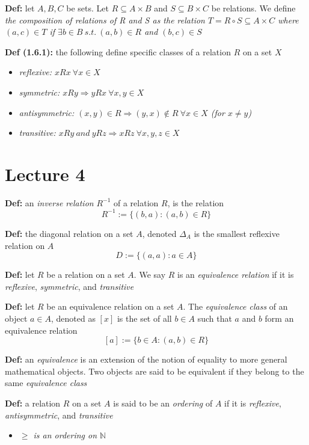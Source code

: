 \documentclass[12pt]{article}
\begin{document}
\textbf{Def: }let $A, B, C$ be sets. Let $R \subseteq A \times B$ and $S \subseteq B \times C$ be relations. We define \emph{the composition of relations of R and S as the relation $T = R \circ S \subseteq A \times C$ where $(a, c) \in T$ if $\exists b \in B\ s.t.\ (a, b) \in R$ and $(b, c) \in S$}

\textbf{Def (1.6.1): }the following define specific classes of a relation $R$ on a set $X$
\begin{itemize}
    \item \emph{reflexive: $xRx\ \forall x \in X$}
    \item \emph{symmetric: $xRy \Rightarrow yRx\ \forall x, y \in X$}
    \item \emph{antisymmetric: $(x, y) \in R \Rightarrow (y, x) \notin R\ \forall x \in X$ (for $x \neq y$)}
    \item \emph{transitive: $xRy\ and\ yRz \Rightarrow xRz\  \forall x, y, z \in X$}
\end{itemize}
\clearpage

\section{Lecture 4}
\textbf{Def: }an \emph{inverse relation} $R^{-1}$ of a relation $R$, is the relation $$R^{-1} := \{ (b, a) : (a, b) \in R \}$$

\textbf{Def: }the diagonal relation on a set $A$, denoted $\Delta_{A}$ is the smallest reflexive relation on $A$
$$D := \{ (a, a) : a \in A \}$$

\textbf{Def: }let $R$ be a relation on a set $A$. We say $R$ is an \emph{equivalence relation} if it is \emph{reflexive}, \emph{symmetric}, and \emph{transitive}

\textbf{Def: }let $R$ be an equivalence relation on a set $A$. The \emph{equivalence class} of an object $a \in A$, denoted as $[x]$ is the set of all $b \in A$ such that $a$ and $b$ form an equivalence relation
$$[a] := \{ b \in A : (a, b) \in R \}$$

\textbf{Def: }an \emph{equivalence} is an extension of the notion of equality to more general mathematical objects. Two objects are said to be equivalent if they belong to the same \emph{equivalence class}

\textbf{Def: }a relation $R$ on a set $A$ is said to be an \emph{ordering} of $A$ if it is \emph{reflexive}, \emph{antisymmetric}, and \emph{transitive}
\begin{itemize}
    \item \emph{$\geq$ is an ordering on $\mathbb{N}$}
\end{itemize}
\end{document}
